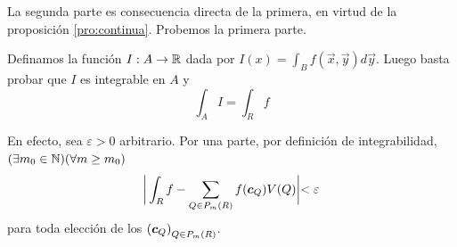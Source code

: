 \begin{demostracion}
La segunda parte es consecuencia directa de la primera, en virtud de la proposici\'on \ref{pro:continua}. Probemos la primera parte.

Definamos la funci\'on $I:A \to \mathbb{R} $ dada por $I(x) = \int_B f(\vec{x},\vec{y})d\vec{y} $. Luego basta probar que $ I $ es integrable en $ A $ y
\[
    \int_A I = \int_R f
\]

En efecto, sea $ \varepsilon > 0 $ arbitrario. Por una parte, por definici\'on de integrabilidad, $(\exists m_0\in \mathbb{N}) (\forall m \geq m_0)$
\begin{equation}\label{equ:1}
\biggr\lvert \int_R f - \sum_{Q \in P_{m}(R)} f(\boldsymbol{c}_Q) V(Q) \biggl\rvert < \varepsilon
\end{equation}
para toda elecci\'on de los $ {(\boldsymbol{c}_Q)}_{Q \in P_{m}(R)} $.


\end{demostracion}
